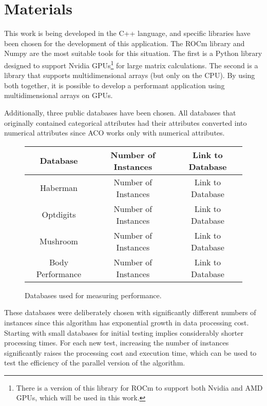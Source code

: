 \section{Materials} \label{Materials}

This work is being developed in the C++ language, and specific libraries have been chosen for the development of this application. The ROCm library\cite{cupyLib} and Numpy\cite{numpyLib} are the most suitable tools for this situation. The first is a Python library designed to support Nvidia GPUs\footnote[1]{There is a version of this library for ROCm to support both Nvidia and AMD GPUs, which will be used in this work.} for large matrix calculations. The second is a library that supports multidimensional arrays (but only on the CPU). By using both together, it is possible to develop a performant application using multidimensional arrays on GPUs.

Additionally, three public databases have been chosen. All databases that originally contained categorical attributes had their attributes converted into numerical attributes since ACO works only with numerical attributes.

\begin{figure}
    \begin{center}
        \begin{tabular}{|c|c|c|}
            \hline
            Database & Number of Instances & Link to Database \\
            \hline
            Haberman & Number of Instances & Link to Database \\
            \hline
            Optdigits & Number of Instances & Link to Database \\
            \hline
            Mushroom & Number of Instances & Link to Database \\
            \hline
            Body Performance & Number of Instances & Link to Database \\
            \hline
        \end{tabular}
        \caption{Databases used for measuring performance.}
    \end{center}
    \label{fig:datasets}
\end{figure}

These databases were deliberately chosen with significantly different numbers of instances since this algorithm has exponential growth in data processing cost. Starting with small databases for initial testing implies considerably shorter processing times. For each new test, increasing the number of instances significantly raises the processing cost and execution time, which can be used to test the efficiency of the parallel version of the algorithm.

